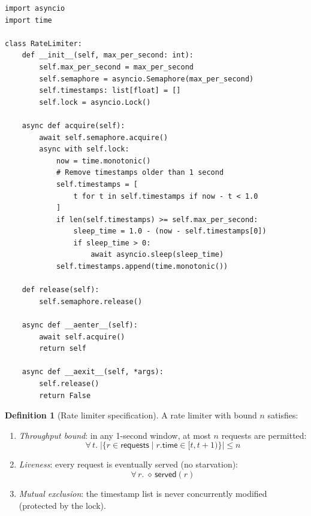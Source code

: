 \documentclass[11pt,a4paper]{report}
\theoremstyle{definition}
\newtheorem{definition}{Definition}[chapter]
\theoremstyle{plain}
\begin{document}
\begin{lstlisting}[style=python]
import asyncio
import time

class RateLimiter:
    def __init__(self, max_per_second: int):
        self.max_per_second = max_per_second
        self.semaphore = asyncio.Semaphore(max_per_second)
        self.timestamps: list[float] = []
        self.lock = asyncio.Lock()

    async def acquire(self):
        await self.semaphore.acquire()
        async with self.lock:
            now = time.monotonic()
            # Remove timestamps older than 1 second
            self.timestamps = [
                t for t in self.timestamps if now - t < 1.0
            ]
            if len(self.timestamps) >= self.max_per_second:
                sleep_time = 1.0 - (now - self.timestamps[0])
                if sleep_time > 0:
                    await asyncio.sleep(sleep_time)
            self.timestamps.append(time.monotonic())

    def release(self):
        self.semaphore.release()

    async def __aenter__(self):
        await self.acquire()
        return self

    async def __aexit__(self, *args):
        self.release()
        return False
\end{lstlisting}

\begin{definition}[Rate limiter specification]
A rate limiter with bound $n$ satisfies:
\begin{enumerate}
  \item \emph{Throughput bound}: in any 1-second window, at most $n$ requests
    are permitted:
    \[
      \forall\, t.\; |\{r \in \mathsf{requests} \mid
        r.\mathsf{time} \in [t, t+1)\}| \leq n
    \]
  \item \emph{Liveness}: every request is eventually served (no starvation):
    \[
      \forall\, r.\; \diamond\, \mathsf{served}(r)
    \]
  \item \emph{Mutual exclusion}: the timestamp list is never concurrently
    modified (protected by the lock).
\end{enumerate}
\end{definition}
\end{document}
